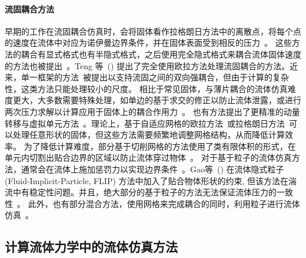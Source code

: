 \paragraph{流固耦合方法}
早期的工作在流固耦合仿真时，会将固体看作拉格朗日方法中的离散点，将每个点的速度在流体中对应为诺伊曼边界条件，并在固体表面受到相反的压力~\cite{Yngve:2000,Foster:2001,Carlson-2004,Takahashi-2002,Genevaux-2003}。
这些方法的耦合有显式格式也有半隐式格式，之后使用完全隐式格式来耦合流体固体速度的方法也被提出~\cite{Klingner-2006,Chentanez:2006:SCP,Batty-2007}。Teng 等~(\citeyear{Teng-2016}) 提出了完全使用欧拉方法处理流固耦合的方法。近来，单一框架的方法~\cite{takahashi-2020,fang-2020}被提出以支持流固之间的双向强耦合，但由于计算的复杂性，这类方法只能处理较小的尺度。
相比于常见固体，与薄片耦合的流体仿真难度更大，大多数需要特殊处理，如单边的基于求交的修正以防止流体泄露，或进行两次压力求解以计算应用于固体上的耦合作用力~\cite{Guendelman-2005}。
也有方法提出了更精准的动量转移与虚拟单元方法~\cite{Robinson-2008,Robinson:2009}。理论上，基于自适应网格的欧拉方法~\cite{Feldman:DF:2005,Feldman-2005,dai-2005,Klingner-2006,Elcott-2007}或拉格朗日方法~\cite{Misztal:2010,Clausen-2013}可以处理任意形状的固体，但这些方法需要频繁地调整网格结构，从而降低计算效率。
为了降低计算难度，部分基于切削网格的方法使用了类有限体积的形式，在单元内切割出贴合边界的区域以防止流体穿过物体~\cite{Roble-2005,Batty-2007,Ng-2009,gibou-2012,weber-2015,Edwards-2014,Liu:2015:MVF,Azevedo-2016}。
对于基于粒子的流体仿真方法，通常会在流体上施加惩罚力以实现边界条件~\cite{peer-2015,Ihmsen-2013}。Gao等~(\citeyear{Gao:2017}) 在流体隐式粒子 (Fluid-Implicit-Particle, FLIP) 方法中加入了贴合物体形状的约束, 但该方法在湍流中有稳定性问题。并且，绝大部分的基于粒子的方法无法保证流体压力的一致性~\cite{band-2018}。
此外，也有部分混合方法，使用网格来完成耦合的同时，利用粒子进行流体仿真~\cite{Zhang-2016,Fei-2018,hu-2018,Fei-2019}。

\subsection{计算流体力学中的流体仿真方法}
